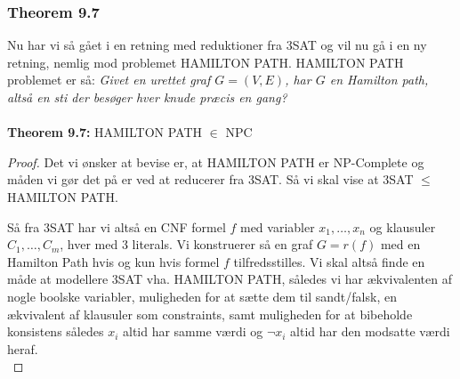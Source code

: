 \subsubsection{Theorem 9.7}

Nu har vi så gået i en retning med reduktioner fra 3SAT og vil nu gå i en ny
retning, nemlig mod problemet HAMILTON PATH. 
HAMILTON PATH problemet er så: \textit{Givet en urettet graf $G=(V,E)$, har $G$
en Hamilton path, altså en sti der besøger hver knude præcis en gang?}\\
~\\
\textbf{Theorem 9.7:} HAMILTON PATH $\in$ NPC

\begin{proof}
 Det vi ønsker at bevise er, at HAMILTON PATH er NP-Complete og måden vi gør
 det på er ved at reducerer fra 3SAT. Så vi skal vise at 3SAT $\leq$ HAMILTON
 PATH.

Så fra 3SAT har vi altså en CNF formel $f$ med variabler $x_1,\hdots,x_n$ og
klausuler $C_1,\hdots,C_m$, hver med 3 literals. Vi konstruerer så en graf $G =
r(f)$ med en Hamilton Path hvis og kun hvis formel $f$ tilfredsstilles.
Vi skal altså finde en måde at modellere 3SAT vha. HAMILTON PATH, således vi
har ækvivalenten af nogle boolske variabler, muligheden for at sætte dem til
sandt/falsk, en ækvivalent af klausuler som constraints, samt muligheden for at
bibeholde konsistens således $x_i$ altid har samme værdi og $\neg x_i$ altid
har den modsatte værdi heraf.\\


\end{proof}

